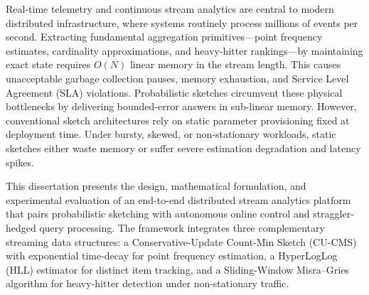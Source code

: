 \noindent
Real-time telemetry and continuous stream analytics are central to modern distributed infrastructure, where systems routinely process millions of events per second. Extracting fundamental aggregation primitives---point frequency estimates, cardinality approximations, and heavy-hitter rankings---by maintaining exact state requires $O(N)$ linear memory in the stream length. This causes unacceptable garbage collection pauses, memory exhaustion, and Service Level Agreement (SLA) violations. Probabilistic sketches circumvent these physical bottlenecks by delivering bounded-error answers in sub-linear memory. However, conventional sketch architectures rely on static parameter provisioning fixed at deployment time. Under bursty, skewed, or non-stationary workloads, static sketches either waste memory or suffer severe estimation degradation and latency spikes.

This dissertation presents the design, mathematical formulation, and experimental evaluation of an end-to-end distributed stream analytics platform that pairs probabilistic sketching with autonomous online control and straggler-hedged query processing. The framework integrates three complementary streaming data structures: a Conservative-Update Count-Min Sketch (CU-CMS) with exponential time-decay for point frequency estimation, a HyperLogLog (HLL) estimator for distinct item tracking, and a Sliding-Window Misra--Gries algorithm for heavy-hitter detection under non-stationary traffic.

